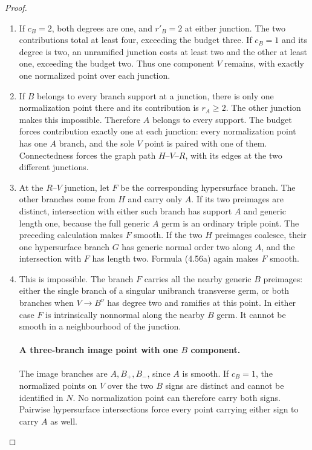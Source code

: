 \begin{proof}
\begin{enumerate}[label={$\langle1\rangle$\arabic*.},leftmargin=*]
\item If $c_B=2$, both degrees are one, and $r'_B=2$ at either
junction. The two contributions total at least four,
exceeding the budget three. If $c_B=1$ and its degree is
two, an unramified junction costs at least two and the
other at least one, exceeding the budget two. Thus one
component $V$ remains, with exactly one normalized point
over each junction.

\item If $B$ belongs to every branch support at a junction,
there is only one normalization point there and its
contribution is $r_A\ge2$. The other junction makes this
impossible. Therefore $A$ belongs to every support. The
budget forces contribution exactly one at each junction:
every normalization point has one $A$ branch, and the
sole $V$ point is paired with one of them. Connectedness
forces the graph path $H$--$V$--$R$, with its edges at
the two different junctions.

\item At the $R$--$V$ junction, let $F$ be the corresponding
hypersurface branch. The other branches come from $H$
and carry only $A$. If its two preimages are distinct,
intersection with either such branch has support $A$ and
generic length one, because the full generic $A$ germ
is an ordinary triple point. The preceding calculation
makes $F$ smooth. If the two $H$ preimages coalesce,
their one hypersurface branch $G$ has generic normal
order two along $A$, and the intersection with $F$ has
length two. Formula (4.56a) again makes $F$ smooth.

\item This is impossible. The branch $F$ carries all the nearby
generic $B$ preimages: either the single branch of a
singular unibranch transverse germ, or both branches
when $V\to B^\nu$ has degree two and ramifies at this
point. In either case $F$ is intrinsically nonnormal
along the nearby $B$ germ. It cannot be smooth in a
neighbourhood of the junction.

\paragraph{A three-branch image point with one $B$ component.}
The image branches are $A,B_+,B_-$, since $A$ is smooth.
If $c_B=1$, the normalized points on $V$ over the two
$B$ signs are distinct and cannot be identified in $N$.
No normalization point can therefore carry both signs.
Pairwise hypersurface intersections force every point
carrying either sign to carry $A$ as well.


\end{enumerate}
\end{proof}
